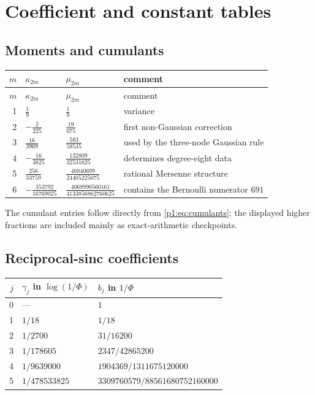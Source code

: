 \documentclass[11pt]{article}
\numberwithin{equation}{section}
\theoremstyle{definition}
\theoremstyle{remark}
\begin{document}
\appendix
\renewcommand*{\theHsection}{\arabic{part}.\arabic{section}}

\section{Coefficient and constant tables}
\label{p1:app:tables}

\subsection{Moments and cumulants}

\begin{longtable}{@{}rlll@{}}
\toprule
$m$ & $\kappa_{2m}$ & $\mu_{2m}$ & comment\\
\midrule
\endfirsthead
\toprule
$m$ & $\kappa_{2m}$ & $\mu_{2m}$ & comment\\
\midrule
\endhead
1 & $\frac19$ & $\frac19$ & variance\\
2 & $-\frac2{225}$ & $\frac{19}{675}$ & first non-Gaussian correction\\
3 & $\frac{16}{3969}$ & $\frac{583}{59535}$ & used by the three-node Gaussian rule\\
4 & $-\frac{16}{3825}$ & $\frac{132809}{32531625}$ & determines degree-eight data\\
5 & $\frac{256}{33759}$ & $\frac{46840699}{24405225075}$ & rational Mersenne structure\\
6 & $-\frac{353792}{16769025}$ & $\frac{4068990560161}{4133856862760625}$ & contains the Bernoulli numerator $691$\\
\bottomrule
\end{longtable}

The cumulant entries follow directly from \eqref{p1:eq:cumulants}; the displayed higher fractions are included mainly as exact-arithmetic checkpoints.

\subsection{Reciprocal-sinc coefficients}

\begin{center}
\begin{tabular}{@{}rll@{}}
\toprule
$j$ & $\gamma_j$ in $\log(1/\Phi)$ & $b_j$ in $1/\Phi$\\
\midrule
0 & --- & $1$\\
1 & $1/18$ & $1/18$\\
2 & $1/2700$ & $31/16200$\\
3 & $1/178605$ & $2347/42865200$\\
4 & $1/9639000$ & $1904369/1311675120000$\\
5 & $1/478533825$ & $3309760579/88561680752160000$\\
\bottomrule
\end{tabular}
\end{center}
\end{document}
